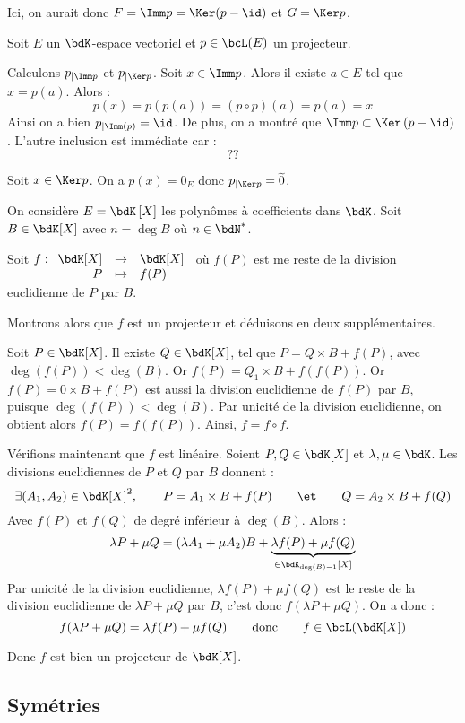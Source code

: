 \documentclass[a4paper,french,bookmarks]{article}
\begin{document}
Ici, on aurait donc $F = \Imm p = \Ker(p - \id)$ et $G = \Ker p$. 

\begin{nproof}
    Soit $E$ un $\bdK$-espace vectoriel et $p \in \bcL(E)$ un projecteur.
    
    \begin{enumerate}
        \itt Calculons $p_{\vert\Imm p}$ et $p_{\vert\Ker p}$. Soit $x \in \Imm p$. Alors il existe $a \in E$ tel que $x = p\left(a\right)$. Alors :
        \[ p(x) = p\left(p\left(a\right)\right) = \left(p \circ p\right)(a) = p(a) = x\]
        Ainsi on a bien $p_{\vert\Imm(p)} = \id$. De plus, on a montré que $\Imm p \subset \Ker\left(p - \id\right)$.  L'autre inclusion est immédiate car :
        \[ ??\]
        
        \itt Soit $x \in \Ker p$. On a $p\left(x\right) = 0_E$ donc $p_{\vert \Ker p} = \widetilde 0$.
    \end{enumerate}
\end{nproof}

\begin{example}{}{}
    On considère $E = \bdK\left[X\right]$ les polynômes à coefficients dans $\bdK$. Soit $B \in \bdK[X]$ avec $n = \deg B$ où $n \in \bdN^*$.
    
    Soit $f : \begin{array}[t]{rcl}
        \bdK[X] &\to& \bdK[X]  \\
        P &\mapsto& f(P) 
    \end{array}$ où $f(P)$ est me reste de la division euclidienne de $P$ par $B$. 
    
    Montrons alors que $f$ est un projecteur et déduisons en deux supplémentaires.
    
    \tcblower
    
    Soit $P \in \bdK[X]$. Il existe $Q \in \bdK[X]$, tel que $P = Q\times B + f(P)$, avec $\deg(f(P)) < \deg(B)$. Or $f(P) = Q_1\times B + f(f(P))$. Or $f(P) = 0 \times B + f(P)$ est aussi la division euclidienne de $f(P)$ par $B$, puisque $\deg(f(P)) < \deg(B)$. Par unicité de la division euclidienne, on obtient alors $f(P) = f(f(P))$. Ainsi, $f = f \circ f$.
    
    Vérifions maintenant que $f$ est linéaire. Soient $P, Q \in \bdK[X]$ et $\lambda, \mu \in \bdK$. Les divisions euclidiennes de $P$ et $Q$ par $B$ donnent :
    \[ \exists (A_1, A_2) \in \bdK[X]^2,\qquad P = A_1 \times B + f(P) \qquad\et\qquad Q = A_2 \times B + f(Q)\]
    Avec $f(P)$ et $f(Q)$ de degré inférieur à $\deg(B)$. Alors :
    \[\lambda P + \mu Q = (\lambda A_1 + \mu A_2)B + \underbrace{\lambda f(P) + \mu f(Q)}_{\in \bdK_{\deg(B) - 1}[X]}\]
    Par unicité de la division euclidienne, $\lambda f(P) + \mu f(Q)$ est le reste de la division euclidienne de $\lambda P + \mu Q$ par $B$, c'est donc $f(\lambda P + \mu Q)$. On a donc :
    \[ f(\lambda P + \mu Q) = \lambda f(P) + \mu f(Q) \qquad\text{donc}\qquad f \in \bcL(\bdK[X])\]
    
    Donc $f$ est bien un projecteur de $\bdK[X]$.
\end{example}

\subsection{Symétries}
\end{document}
